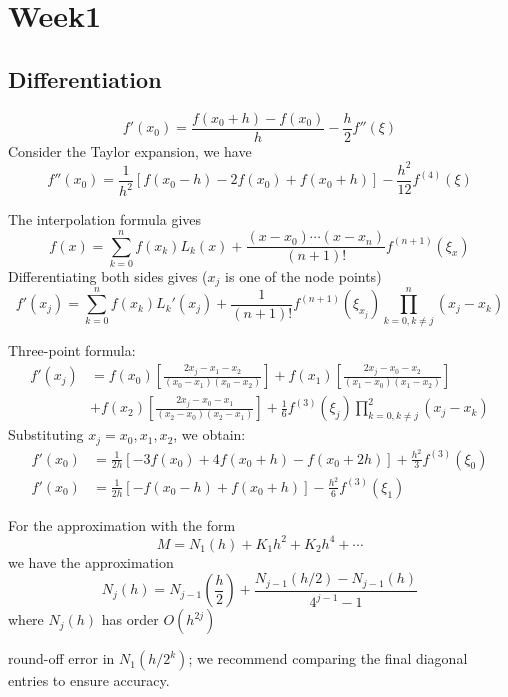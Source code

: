 
\chapter{Week1}
\section{Differentiation}
\begin{definition}
\[
f'(x_0)=\frac{f(x_0+h)-f(x_0)}{h}-\frac{h}{2}f''(\xi)
\]
Consider the Taylor expansion, we have
\[
f''(x_0)=\frac{1}{h^2}[f(x_0-h)-2f(x_0)+f(x_0+h)]-\frac{h^2}{12}f^{(4)}(\xi)
\]
\end{definition}
\begin{definition}
The interpolation formula gives
\[
f(x)=\sum_{k=0}^nf(x_k)L_k(x)+\frac{(x-x_0)\cdots(x-x_n)}{(n+1)!}f^{(n+1)}(\xi_x)
\]
Differentiating both sides gives ($x_j$ is one of the node points)
\[
f'(x_j)=\sum_{k=0}^nf(x_k)L_k'(x_j)+\frac{1}{(n+1)!}f^{(n+1)}(\xi_{x_j})\prod_{k=0,k\ne j}^n(x_j-x_k)
\]
\end{definition}
\begin{remark}
Three-point formula:
\begin{align*}
f'(x_j)&=f(x_0)\left[\frac{2x_j-x_1-x_2}{(x_0-x_1)(x_0-x_2)}\right]+f(x_1)\left[\frac{2x_j-x_0-x_2}{(x_1-x_0)(x_1-x_2)}\right]\\
&+f(x_2)\left[\frac{2x_j-x_0-x_1}{(x_2-x_0)(x_2-x_1)}\right]+\frac{1}{6}f^{(3)}(\xi_j)\prod_{k=0,k\ne j}^2(x_j-x_k)
\end{align*}
Substituting $x_j=x_0,x_1,x_2$, we obtain:
\begin{align*}
f'(x_0)&=\frac{1}{2h}[-3f(x_0)+4f(x_0+h)-f(x_0+2h)]+\frac{h^2}{3}f^{(3)}(\xi_0)\\
f'(x_0)&=\frac{1}{2h}[-f(x_0-h)+f(x_0+h)]-\frac{h^2}{6}f^{(3)}(\xi_1)
\end{align*}
\end{remark}
\begin{definition}
For the approximation with the form
\[
M=N_1(h)+K_1h^2+K_2h^4+\cdots
\]
we have the approximation
\[
N_j(h)=N_{j-1}(\frac{h}{2})+\frac{N_{j-1}(h/2) - N_{j-1}(h)}{4^{j-1}-1}
\]
where $N_j(h)$ has order $O(h^{2j})$
\end{definition}
round-off error in $N_1(h/2^k)$; we recommend comparing the final diagonal entries to ensure accuracy.


